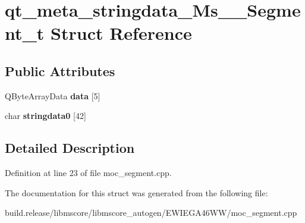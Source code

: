 \hypertarget{structqt__meta__stringdata___ms_____segment__t}{}\section{qt\+\_\+meta\+\_\+stringdata\+\_\+\+Ms\+\_\+\+\_\+\+Segment\+\_\+t Struct Reference}
\label{structqt__meta__stringdata___ms_____segment__t}
\subsection*{Public Attributes}
\begin{DoxyCompactItemize}
\item 
\mbox{\label{structqt__meta__stringdata___ms_____segment__t_a7cf2c7c1edcb80e9440daeafa378a3ac}} 
Q\+Byte\+Array\+Data {\bfseries data} \mbox{[}5\mbox{]}
\item 
\mbox{\label{structqt__meta__stringdata___ms_____segment__t_a17d16a6d15def17e97a84d715d2031df}} 
char {\bfseries stringdata0} \mbox{[}42\mbox{]}
\end{DoxyCompactItemize}


\subsection{Detailed Description}


Definition at line 23 of file moc\+\_\+segment.\+cpp.



The documentation for this struct was generated from the following file\+:\begin{DoxyCompactItemize}
\item 
build.\+release/libmscore/libmscore\+\_\+autogen/\+E\+W\+I\+E\+G\+A46\+W\+W/moc\+\_\+segment.\+cpp\end{DoxyCompactItemize}
